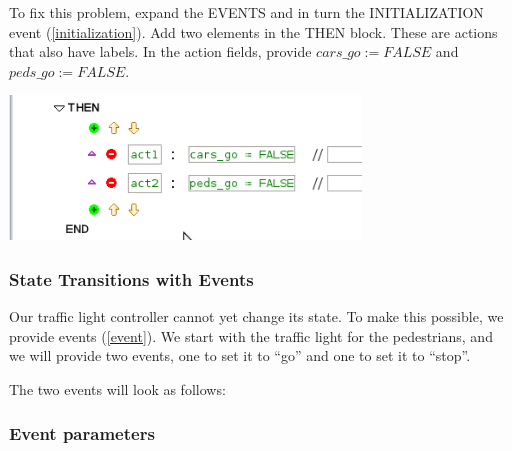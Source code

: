 To fix this problem, expand the \textsf{EVENTS} and in turn the INITIALIZATION event (\ref{initialization}).  Add two elements in the \textsf{THEN} block.  These are actions that also have labels.  In the action fields, provide $cars\_go :=  FALSE$ and $peds\_go :=  FALSE$.
\begin{center}
	\includegraphics[width=0.7\textwidth]{img/tutorial/events.png}
\end{center}

\subsubsection{State Transitions with Events}

Our traffic light controller cannot yet change its state.  To make this possible, we provide events (\ref{event}). We start with the traffic light for the pedestrians, and we will provide two events, one to set it to ``go'' and one to set it to ``stop''.


The two events will look as follows:


\subsubsection{Event parameters}

